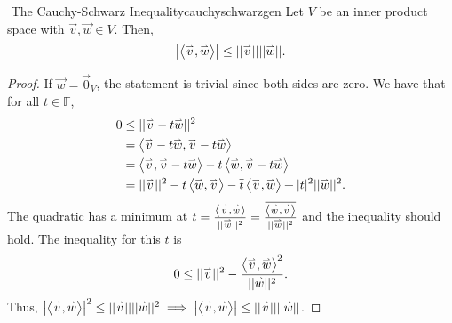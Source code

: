         \begin{theorem}{\Stop\,\,The Cauchy-Schwarz Inequality}{cauchyschwarzgen}
            Let \(V\) be an inner product space with \(\vec{v},\vec{w}\in V\). Then,
            \begin{equation*}
                \left|\iprod{\vec{v}}{\vec{w}}\right|\leq||\vec{v}||||\vec{w}||.
            \end{equation*}
            \begin{proof}
                If \(\vec{w}=\vec{0}_V\), the statement is trivial since both sides are zero. We have that for all \(t\in\mathbb{F}\),
                \begin{align*}
                    0&\leq||\vec{v}-t\vec{w}||^2 \\
                    &=\iprod{\vec{v}-t\vec{w}}{\vec{v}-t\vec{w}} \\
                    &=\iprod{\vec{v}}{\vec{v}-t\vec{w}}-t\iprod{\vec{w}}{\vec{v}-t\vec{w}} \\
                    &=||\vec{v}||^2-t\iprod{\vec{w}}{\vec{v}}-\bar{t}\iprod{\vec{v}}{\vec{w}}+|t|^2||\vec{w}||^2.
                \end{align*}
                The quadratic has a minimum at \(t=\frac{\iprod{\vec{v}}{\vec{w}}}{||\vec{w}||^2}=\frac{\bar{\iprod{\vec{w}}{\vec{v}}}}{||\vec{w}||^2}\) and the inequality should hold. The inequality for this \(t\) is
                \begin{equation*}
                    0\leq||\vec{v}||^2-\frac{\iprod{\vec{v}}{\vec{w}}^2}{||\vec{w}||^2}.
                \end{equation*}
                Thus, \(\left|\iprod{\vec{v}}{\vec{w}}\right|^2\leq||\vec{v}||||\vec{w}||^2\implies\left|\iprod{\vec{v}}{\vec{w}}\right|\leq||\vec{v}||||\vec{w}||\).
            \end{proof}
        \end{theorem}
        \pagebreak
